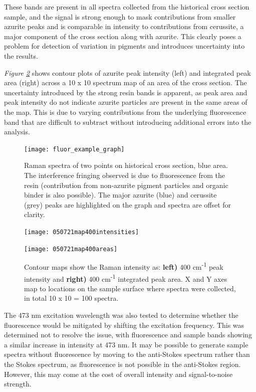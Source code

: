 These bands are present in all spectra collected from the historical cross section sample, and the signal is strong enough to mask contributions from smaller azurite peaks and is comparable in intensity to contributions from cerussite, a major component of the cross section along with azurite. This clearly poses a problem for detection of variation in pigments and introduces uncertainty into the results.

\textit{Figure \ref{fig:contours_xsection}} shows contour plots of azurite peak intensity (left) and integrated peak area (right) across a 10 x 10 spectrum map of an area of the cross section. The uncertainty introduced by the strong resin bands is apparent, as peak area and peak intensity do not indicate azurite particles are present in the same areas of the map. This is due to varying contributions from the underlying fluorescence band that are difficult to subtract without introducing additional errors into the analysis.

\begin{figure}[H]
\centering
  \texttt{[image: fluor\_example\_graph]}
\caption[Raman spectra of historical cross section]{Raman spectra of two points on historical cross section, blue area. The interference fringing observed is due to fluorescence from the resin (contribution from non-azurite pigment particles and organic binder is also possible). The major azurite (blue) and cerussite (grey) peaks are highlighted on the graph and spectra are offset for clarity.}
\label{fig:fluor_example_graph}
\end{figure}


\begin{figure}[H]
\centering
\begin{minipage}{.45\textwidth}
  \centering
  \texttt{[image: 050721map400intensities]}
\end{minipage}
\begin{minipage}{.45\textwidth}
  \centering
  \texttt{[image: 050721map400areas]}
\end{minipage}
\caption[Contour maps, azurite Raman intensity in historical cross section]{Contour maps show the Raman intensity as: \textbf{left)} 400 cm\textsuperscript{-1} peak intensity and \textbf{right)} 400 cm\textsuperscript{-1} integrated peak area. X and Y axes map to locations on the sample surface where spectra were collected, in total 10 x 10 = 100 spectra.}
\label{fig:contours_xsection}
\end{figure}

The 473 nm excitation wavelength was also tested to determine whether the fluorescence would be mitigated by shifting the excitation frequency. This was determined not to resolve the issue, with fluorescence and sample bands showing a similar increase in intensity at 473 nm. It may be possible to generate sample spectra without fluorescence by moving to the anti-Stokes spectrum rather than the Stokes spectrum, as fluorescence is not possible in the anti-Stokes region. However, this may come at the cost of overall intensity and signal-to-noise strength.


